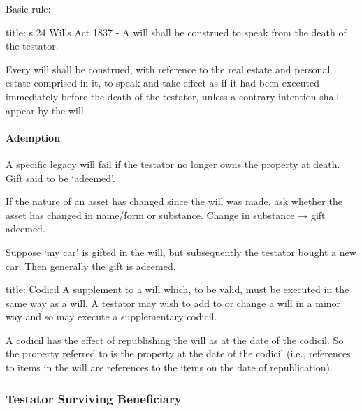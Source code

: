 \documentclass[
]{article}
\newenvironment{Shaded}{}{}
\newcommand{\NormalTok}[1]{#1}
\begin{document}
Basic rule:

\begin{Shaded}
\begin{Highlighting}[]
\NormalTok{title: s 24 Wills Act 1837 {-} A will shall be construed to speak from the death of the testator.}

\NormalTok{Every will shall be construed, with reference to the real estate and personal estate comprised in it, to speak and take effect as if it had been executed immediately before the death of the testator, unless a contrary intention shall appear by the will. }
\end{Highlighting}
\end{Shaded}

\hypertarget{ademption}{%
\paragraph{Ademption}\label{ademption}}

A specific legacy will fail if the testator no longer owns the property
at death. Gift said to be `adeemed'.

If the nature of an asset has changed since the will was made, ask
whether the asset has changed in name/form or substance. Change in
substance → gift adeemed.

Suppose `my car' is gifted in the will, but subsequently the testator
bought a new car. Then generally the gift is adeemed.

\begin{Shaded}
\begin{Highlighting}[]
\NormalTok{title: Codicil}
\NormalTok{A supplement to a will which, to be valid, must be executed in the same way as a will. A testator may wish to add to or change a will in a minor way and so may execute a supplementary codicil.}
\end{Highlighting}
\end{Shaded}

A codicil has the effect of republishing the will as at the date of the
codicil. So the property referred to is the property at the date of the
codicil (i.e., references to items in the will are references to the
items on the date of republication).

\hypertarget{testator-surviving-beneficiary}{%
\subsubsection{Testator Surviving
Beneficiary}\label{testator-surviving-beneficiary}}
\end{document}
